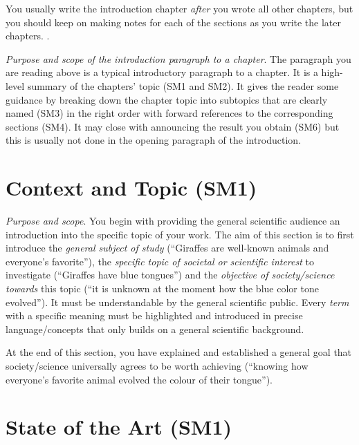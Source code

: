 \documentclass[
  fontsize=10pt,
  numbers=noenddot,
  english,  %
  paper=a5,
  twoside,  %
  DIV=calc,
  headings=small,
  bibliography=totoc,
  listof=totoc,
  draft=false
]{scrbook}
\theoremstyle{break}
\begin{document}
You usually write the introduction chapter \emph{after} you wrote all other chapters, but you should keep on making notes for each of the sections as you write the later chapters.
.

\emph{Purpose and scope of the introduction paragraph to a chapter}.
The paragraph you are reading above is a typical introductory paragraph to a chapter.
It is a high-level summary of the chapters' topic (SM1 and SM2).
It gives the reader some guidance by breaking down the chapter topic into subtopics that are clearly named (SM3) in the right order with forward references to the corresponding sections (SM4).
It may close with announcing the result you obtain (SM6) but this is usually not done in the opening paragraph of the introduction.

\section{Context and Topic (SM1)}\label{sec:introduction:topic}

\emph{Purpose and scope}.
You begin with providing the general scientific audience an introduction into the specific topic of your work.
The aim of this section is to first introduce the \emph{general subject of study} (``Giraffes are well-known animals and everyone's favorite''), the \emph{specific topic of societal or scientific interest} to investigate (``Giraffes have blue tongues'') and the \emph{objective of society/science towards} this topic (``it is unknown at the moment how the blue color tone evolved'').
It must be understandable by the general scientific public.
Every \emph{term} with a specific meaning must be highlighted and introduced in precise language/concepts that only builds on a general scientific background.

At the end of this section, you have explained and established a general goal that society/science universally agrees to be worth achieving (``knowing how everyone's favorite animal evolved the colour of their tongue'').

\section{State of the Art (SM1)}\label{sec:introduction:state-of-art}
\end{document}
